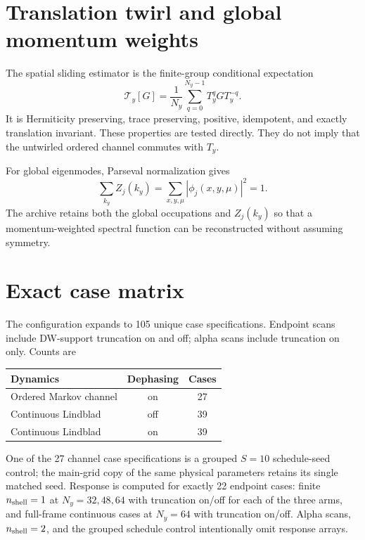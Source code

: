\documentclass[aps,prb,onecolumn,nofootinbib]{revtex4-2}
\begin{document}
\section{Translation twirl and global momentum weights}

The spatial sliding estimator is the finite-group conditional expectation
\begin{equation}
 \mathcal T_y[G]=\frac1{N_y}\sum_{q=0}^{N_y-1}T_y^qGT_y^{-q}.
\end{equation}
It is Hermiticity preserving, trace preserving, positive, idempotent, and exactly
translation invariant.  These properties are tested directly.  They do not imply that
the untwirled ordered channel commutes with $T_y$.

For global eigenmodes, Parseval normalization gives
\begin{equation}
 \sum_{k_y}Z_j(k_y)=
 \sum_{x,y,\mu}|\phi_j(x,y,\mu)|^2=1.
\end{equation}
The archive retains both the global occupations and $Z_j(k_y)$ so that a
momentum-weighted spectral function can be reconstructed without assuming symmetry.

\section{Exact case matrix}

The configuration expands to 105 unique case specifications.  Endpoint scans include
DW-support truncation on and off; alpha scans include truncation on only.  Counts are
\begin{center}
\begin{tabular}{lcc}
\toprule
Dynamics & Dephasing & Cases\\
\midrule
Ordered Markov channel & on & 27\\
Continuous Lindblad & off & 39\\
Continuous Lindblad & on & 39\\
\bottomrule
\end{tabular}
\end{center}
One of the 27 channel case specifications is a grouped $S=10$ schedule-seed control;
the main-grid copy of the same physical parameters retains its single matched seed.
Response is computed for exactly 22 endpoint cases: finite $n_{\rm shell}=1$ at
$N_y=32,48,64$ with truncation on/off for each of the three arms, and full-frame
continuous cases at $N_y=64$ with truncation on/off.  Alpha scans,
$n_{\rm shell}=2$, and the grouped schedule control intentionally omit response arrays.
\end{document}
